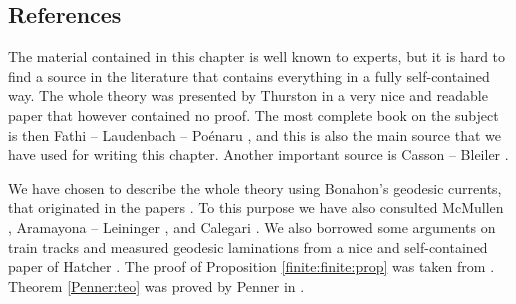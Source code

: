 \subsection{References}
The material contained in this chapter is well known to experts, but it is hard to find a source in the literature that contains everything in a fully self-contained way. The whole theory was presented by Thurston in a very nice and readable paper \cite{Th_diff} that however contained no proof. The most complete book on the subject is then Fathi -- Laudenbach -- Po\'enaru \cite{FLP}, and this is also the main source that we have used for writing this chapter. 
Another important source is Casson -- Bleiler \cite{CB}.

We have chosen to describe the whole theory using Bonahon's geodesic currents, that originated in the papers \cite{B1, B2}. To this purpose we have also consulted McMullen \cite{McM}, Aramayona -- Leininger \cite{AL}, and Calegari \cite{Ca}. We also borrowed some arguments on train tracks and measured geodesic laminations from a nice and self-contained paper of Hatcher \cite{H2}. The proof of Proposition \ref{finite:finite:prop} was taken from \cite[Theorem 6.1]{FM}. Theorem \ref{Penner:teo} was proved by Penner in \cite{Pe}.



